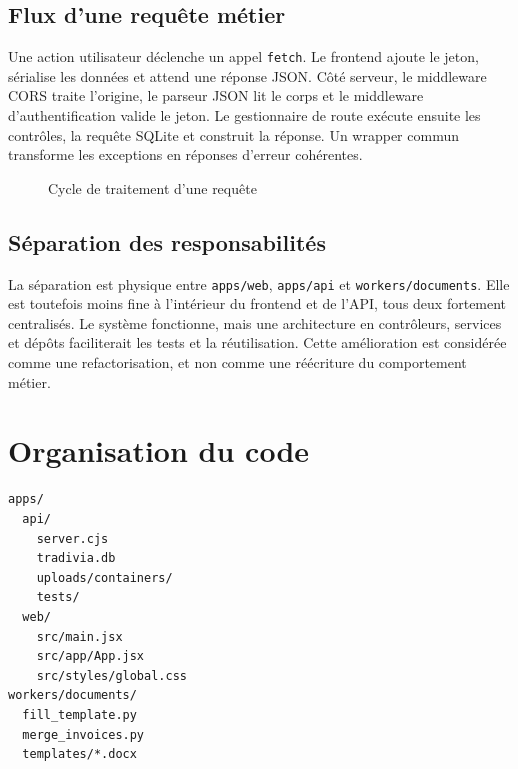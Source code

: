 \documentclass[12pt,a4paper,oneside]{report}
\newcommand{\code}[1]{\texttt{#1}}
\begin{document}
\subsection{Flux d'une requête métier}
Une action utilisateur déclenche un appel \code{fetch}. Le frontend ajoute le jeton, sérialise les données et attend une réponse JSON. Côté serveur, le middleware CORS traite l'origine, le parseur JSON lit le corps et le middleware d'authentification valide le jeton. Le gestionnaire de route exécute ensuite les contrôles, la requête SQLite et construit la réponse. Un wrapper commun transforme les exceptions en réponses d'erreur cohérentes.

\begin{figure}[H]\centering
{}
\caption{Cycle de traitement d'une requête}
\end{figure}

\subsection{Séparation des responsabilités}
La séparation est physique entre \code{apps/web}, \code{apps/api} et \code{workers/documents}. Elle est toutefois moins fine à l'intérieur du frontend et de l'API, tous deux fortement centralisés. Le système fonctionne, mais une architecture en contrôleurs, services et dépôts faciliterait les tests et la réutilisation. Cette amélioration est considérée comme une refactorisation, et non comme une réécriture du comportement métier.

\section{Organisation du code}
\begin{lstlisting}[caption={Arborescence active simplifiée}]
apps/
  api/
    server.cjs
    tradivia.db
    uploads/containers/
    tests/
  web/
    src/main.jsx
    src/app/App.jsx
    src/styles/global.css
workers/documents/
  fill_template.py
  merge_invoices.py
  templates/*.docx
\end{lstlisting}
\end{document}
